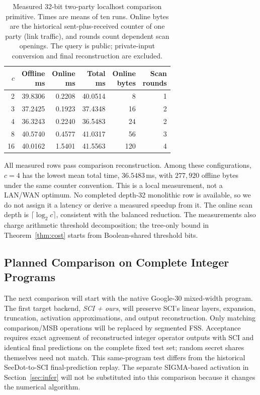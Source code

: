 \documentclass[journal]{IEEEtran}
\theoremstyle{definition}
\theoremstyle{plain}
\newcommand{\nseg}{c}                              %
\begin{document}
\begin{table}[t]
\centering
\caption{Measured 32-bit two-party localhost comparison primitive. Times are
means of ten runs. Online bytes are the historical sent-plus-received counter
of one party (link traffic), and rounds count dependent scan openings.
The query is public; private-input conversion and final reconstruction are
excluded.}
\label{tab:seg-measured}
\small
\setlength{\tabcolsep}{4pt}
\begin{tabular}{rrrrrr}
\toprule
$\nseg$ & \shortstack{Offline\\ms} & \shortstack{Online\\ms} &
\shortstack{Total\\ms} & \shortstack{Online\\bytes} & \shortstack{Scan\\rounds}\\
\midrule
2  & 39.8306 & 0.2208 & 40.0514 & 8   & 1\\
3  & 37.2425 & 0.1923 & 37.4348 & 16  & 2\\
4  & 36.3243 & 0.2240 & 36.5483 & 24  & 2\\
8  & 40.5740 & 0.4577 & 41.0317 & 56  & 3\\
16 & 40.0162 & 1.5401 & 41.5563 & 120 & 4\\
\bottomrule
\end{tabular}
\end{table}

All measured rows pass comparison reconstruction. Among these configurations,
$\nseg=4$ has the lowest mean total time, $36.5483$\,ms, with $277{,}920$
offline bytes under the same counter convention. This is a local measurement,
not a LAN/WAN optimum. No completed depth-32 monolithic row is available, so
we do not assign it a latency or derive a measured speedup from it. The online
scan depth is $\lceil\log_2\nseg\rceil$, consistent with the balanced reduction.
The measurements also charge arithmetic threshold decomposition; the tree-only
bound in Theorem~\ref{thm:cost} starts from Boolean-shared threshold bits.

\subsection{Planned Comparison on Complete Integer Programs}\label{sec:eval-compose}

The next comparison will start with the native Google-30 mixed-width program.
The first target backend, \emph{SCI + ours}, will preserve SCI's linear layers,
expansion, truncation, activation approximations, and output reconstruction.
Only matching comparison/MSB operations will be replaced by segmented FSS.
Acceptance requires exact agreement of reconstructed integer operator outputs
with SCI and identical final predictions on the complete fixed test set;
random secret shares themselves need not match. This same-program test differs
from the historical SeeDot-to-SCI final-prediction replay. The separate
SIGMA-based activation in Section~\ref{sec:infer} will not be substituted into
this comparison because it changes the numerical algorithm.
\end{document}
